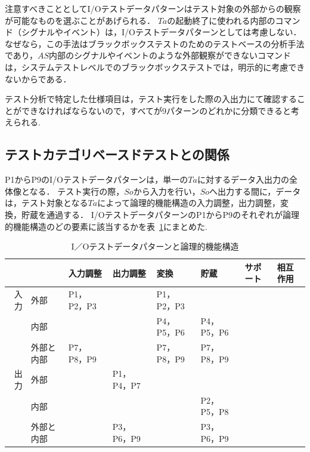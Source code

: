 注意すべきこととしてI/Oテストデータパターンはテスト対象の外部からの観察が可能なものを選ぶことがあげられる．
$Ta$の起動終了に使われる内部のコマンド（シグナルやイベント）は，I/Oテストデータパターンとしては考慮しない．
なぜなら，この手法はブラックボックステストのためのテストベースの分析手法であり，$AS$内部のシグナルやイベントのような外部観察ができないコマンドは，システムテストレベルでのブラックボックステストでは，明示的に考慮できないからである．

テスト分析で特定した仕様項目は，テスト実行をした際の入出力にて確認することができなければならないので，すべてが9パターンのどれかに分類できると考えられる.

\subsection{テストカテゴリベースドテストとの関係}

P1からP9のI/Oテストデータパターンは，単一の$Ta$に対するデータ入出力の全体像となる．
テスト実行の際，$So$から入力を行い，$So$へ出力する間に，データは，テスト対象となる$Ta$によって論理的機能構造の入力調整，出力調整，変換，貯蔵を通過する．
I/OテストデータパターンのP1からP9のそれぞれが論理的機能構造のどの要素に該当するかを表~\ref{tab:D-4-tab1}にまとめた.

\begin{table}[htbp]
  \centering
  \caption{I／Oテストデータパターンと論理的機能構造}
    \begin{tabular}{|r|p{3em}|l|l|l|p{4em}|l|l|}
    \hline
          & \multicolumn{1}{l|}{} & \multicolumn{1}{p{4em}|}{入力調整} & \multicolumn{1}{p{4em}|}{出力調整} & \multicolumn{1}{p{2em}|}{変換} & 貯蔵 & \multicolumn{1}{p{4em}|}{サポート} & \multicolumn{1}{p{4em}|}{相互作用} \bigstrut\\
    \hline
    \hline
    \multicolumn{1}{|p{1.5em}|}{入力} & 外部 & \multicolumn{1}{p{4em}|}{P1，P2，P3} &       & \multicolumn{1}{p{4em}|}{P1，P2，P3} & \multicolumn{1}{l|}{} &       &  \bigstrut\\
\cline{2-8}          & 内部 &       &       & \multicolumn{1}{p{4em}|}{P4，P5，P6} & P4，P5，P6 &       &  \bigstrut\\
\cline{2-8}          & 外部と内部 & \multicolumn{1}{p{4em}|}{P7，P8，P9} &       & \multicolumn{1}{p{4em}|}{P7，P8，P9} & P7，P8，P9 &       &  \bigstrut\\
    \hline
    \multicolumn{1}{|p{1.5em}|}{出力} & 外部 &       & \multicolumn{1}{p{4em}|}{P1，P4，P7} &       & \multicolumn{1}{l|}{} &       &  \bigstrut\\
\cline{2-8}          & 内部 &       &       &       & \multicolumn{1}{p{4em}|}{P2，P5，P8} &       &  \bigstrut\\
\cline{2-8}          & 外部と内部 &       & \multicolumn{1}{p{4em}|}{P3，P6，P9} &       & \multicolumn{1}{p{4em}|}{P3，P6，P9} &       &  \bigstrut\\
    \hline
    \end{tabular}%
  \label{tab:D-4-tab1}%
\end{table}%


